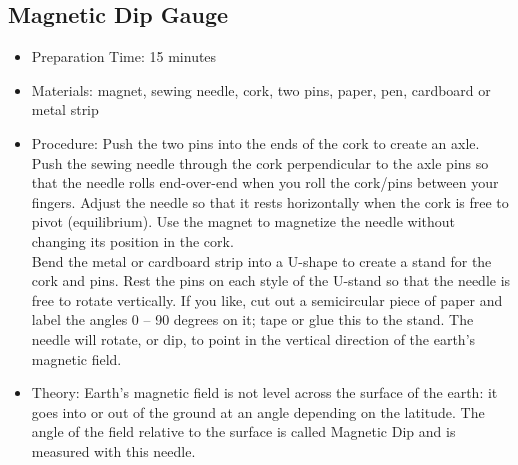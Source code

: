\subsection{Magnetic Dip Gauge}
\begin{itemize}
\item{Preparation Time: 15 minutes}
\item{Materials: magnet, sewing needle, cork, two pins, paper, pen, cardboard or metal strip}
\item{Procedure: Push the two pins into the ends of the cork to create an axle. Push the sewing needle through the cork perpendicular to the axle pins so that the needle rolls end-over-end when you roll the cork/pins between your fingers. Adjust the needle so that it rests horizontally when the cork is free to pivot (equilibrium). Use the magnet to magnetize the needle without changing its position in the cork.\\
Bend the metal or cardboard strip into a U-shape to create a stand for the cork and pins. Rest the pins on each style of the U-stand so that the needle is free to rotate vertically. If you like, cut out a semicircular piece of paper and label the angles 0 – 90 degrees on it; tape or glue this to the stand. The needle will rotate, or dip, to point in the vertical direction of the earth’s magnetic field.}
\item{Theory: Earth’s magnetic field is not level across the surface of the earth: it goes into or out of the ground at an angle depending on the latitude. The angle of the field relative to the surface is called Magnetic Dip and is measured with this needle.}
\end{itemize}

